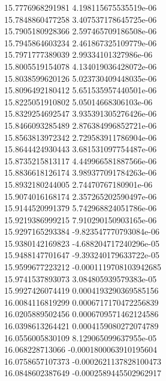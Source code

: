{15.7776968291981 4.198115675535519e-06 \\
15.7848860477258 3.407537178645725e-06 \\
15.7905180928366 2.597465709186508e-06 \\
15.7945864603234 2.461867325109779e-06 \\
15.7971777389039 2.99334101327986e-06 \\
15.8005519154078 4.134019036428072e-06 \\
15.8038599620126 5.023730409448035e-06 \\
15.8096492180412 5.651535957440501e-06 \\
15.8225051910802 5.05014668306103e-06 \\
15.8329254692547 3.935391305276426e-06 \\
15.8466093285489 2.876384996852721e-06 \\
15.8563813972342 2.729583911786904e-06 \\
15.8644424930443 3.681531097754487e-06 \\
15.8735215813117 4.449966581887566e-06 \\
15.8836618126174 3.989377091784263e-06 \\
15.8932180244005 2.74470767180901e-06 \\
15.9074016168174 2.357265202590497e-06 \\
15.9144520991379 5.742968824051786e-06 \\
15.9219386999215 7.910290150903165e-06 \\
15.9297165293384 -9.823547770793084e-06 \\
15.9380142169823 -4.688204717240296e-05 \\
15.9488147701647 -9.393240179633722e-05 \\
15.9599677223212 -0.0001119708103942685 \\
15.9741537893073 3.084805939579383e-05 \\
15.9927426074419 0.0004193290369585156 \\
16.0084116819299 0.0006717170472256839 \\
16.0205889502456 0.0006709571462124586 \\
16.0398613264421 0.0004159080272074789 \\
16.0556005830109 8.129065099637955e-05 \\
16.068228713066 -0.0001800063910195604 \\
16.0758657107373 -0.0002621137828100473 \\
16.0848602387649 -0.0002589445502962917 \\
}

